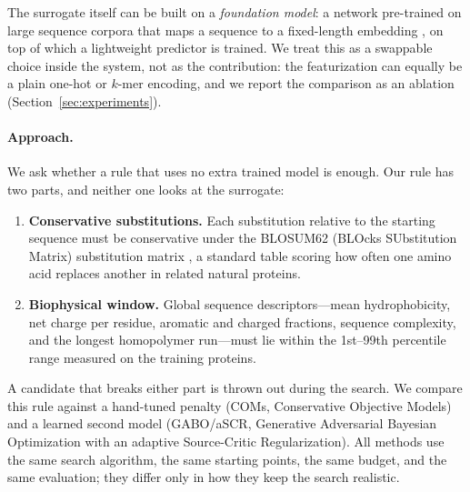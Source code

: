 \documentclass{article}
\begin{document}
The surrogate itself can be built on a \emph{foundation model}: a network pre-trained on
large sequence corpora that maps a sequence to a fixed-length embedding
\citep{lin2023esm2, zhou2023dnabert2}, on top of which a lightweight predictor is trained.
We treat this as a swappable choice inside the system, not as the contribution: the
featurization can equally be a plain one-hot or $k$-mer encoding, and we report the
comparison as an ablation (Section~\ref{sec:experiments}).

\paragraph{Approach.}
We ask whether a rule that uses no extra trained model is enough. Our rule has two parts,
and neither one looks at the surrogate:
\begin{enumerate}
\item \textbf{Conservative substitutions.} Each substitution relative to the starting
sequence must be conservative under the BLOSUM62 (BLOcks SUbstitution Matrix) substitution
matrix \citep{henikoff1992blosum}, a standard table scoring how often one amino acid
replaces another in related natural proteins.
\item \textbf{Biophysical window.} Global sequence descriptors---mean hydrophobicity, net
charge per residue, aromatic and charged fractions, sequence complexity, and the longest
homopolymer run---must lie within the 1st--99th percentile range measured on the training
proteins.
\end{enumerate}
A candidate that breaks either part is thrown out during the search. We compare this rule
against a hand-tuned penalty (COMs, Conservative Objective Models) and a learned second
model (GABO/aSCR, Generative Adversarial Bayesian Optimization with an adaptive Source-Critic
Regularization). All methods use the same search algorithm, the same starting points, the
same budget, and the same evaluation; they differ only in how they keep the search realistic.
\end{document}
